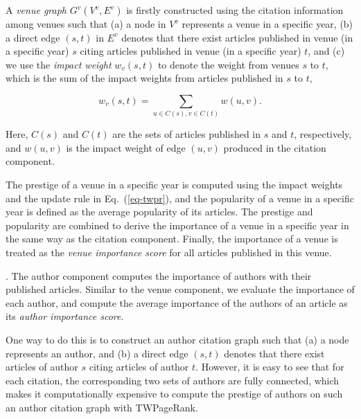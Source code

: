 A {\em venue graph} $G^v(V^v, E^v)$ is firstly constructed using the citation information among venues such that (a) a node in $V^v$ represents a venue in a specific year, (b) a direct edge $(s,t)$ in $E^v$ denotes that there exist articles published in venue (in a specific year) $s$ citing articles published in venue (in a specific year) $t$, and (c) we use the {\em impact weight} $w_v(s,t)$ to denote the weight  from venues $s$ to $t$, which is the sum of the impact weights from articles published in $s$ to $t$, \ie

\vspace{-1ex}
\begin{small}
\begin{equation} \label{eq-infl-weights-v}
w_v(s,t)  = \sum_{u\in C(s), v\in C(t)} w(u,v).
\end{equation}
\end{small}
\noindent
Here, $C(s)$ and $C(t)$ are the sets of articles published in $s$ and $t$, respectively, and $w(u,v)$ is the impact weight of edge $(u, v)$ produced in the citation component.

The prestige of a venue in a specific year is computed using the impact weights and the update rule in Eq.~(\ref{eq-twpr}), and the popularity of a venue in a specific year is defined as the average popularity of its articles. The prestige and popularity are combined to derive the importance of a venue in a specific year in the same way as the citation component. Finally, the importance of a venue is treated as the {\em venue importance score} for all articles published in this venue.






.
The author component computes the importance of authors with their published articles.
%
Similar to the venue component, we evaluate the importance of each author, and compute the average importance of the authors of an article as its {\em author importance score}.

One way to do this is to construct an author citation graph  such that (a) a node represents an author, and (b) a direct edge $(s,t)$ denotes that there exist articles of author $s$ citing articles of author $t$. However, it is easy to see that for each citation, the corresponding two sets of authors are fully connected, which makes it computationally expensive to compute the prestige of authors on such an author citation graph with TWPageRank.


